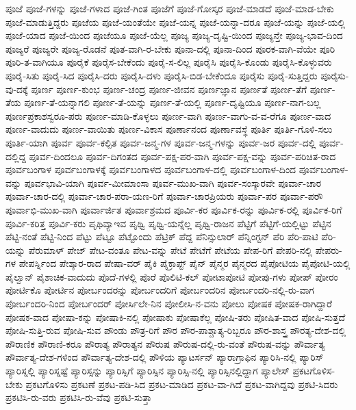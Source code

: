 {ಪೂಜೆ
ಪೂಜೆ-ಗಳನ್ನು
ಪೂಜೆ-ಗಳಾದ
ಪೂಜೆ-ಗಿಂತ
ಪೂಜೆಗೆ
ಪೂಜೆ-ಗೋಸ್ಕರ
ಪೂಜೆ-ಮಾಡದೆ
ಪೂಜೆ-ಮಾಡ-ಬೇಕು
ಪೂಜೆ-ಮಾಡುತ್ತಿದ್ದರು
ಪೂಜೆಯ
ಪೂಜೆ-ಯಂತೆಯೇ
ಪೂಜೆ-ಯನ್ನ
ಪೂಜೆ-ಯನ್ನಾ-ದರೂ
ಪೂಜೆ-ಯನ್ನು
ಪೂಜೆ-ಯಲ್ಲಿ
ಪೂಜೆ-ಯಾದ
ಪೂಜೆ-ಯಿಂದ
ಪೂಜೆಯೂ
ಪೂಜೆ-ಯೆಲ್ಲ
ಪೂಜ್ಯ
ಪೂಜ್ಯ-ದೃಷ್ಟಿ-ಯಿಂದ
ಪೂಜ್ಯನ್ತೇ
ಪೂಜ್ಯ-ಭಾವ-ದಿಂದ
ಪೂಜ್ಯರೆ
ಪೂಜ್ಯರೇ
ಪೂಜ್ಯ-ರೊಡನೆ
ಪೂತ-ವಾಗಿ-ರ-ಬೇಕು
ಪೂನಾ-ದಲ್ಲಿ
ಪೂನಾ-ದಿಂದ
ಪೂರಕ-ವಾಗಿ-ವೆಯೇ
ಪೂರಿ
ಪೂರಿ-ತ-ವಾಗಿಯೂ
ಪೂರೈಕೆ
ಪೂರೈಸ-ಬೇಕೆಂದು
ಪೂರೈ-ಸ-ಲಿಲ್ಲ
ಪೂರೈಸಿ
ಪೂರೈಸಿ-ಕೊಂಡು
ಪೂರೈಸಿ-ಕೊಳ್ಳುವರು
ಪೂರೈ-ಸಿತು
ಪೂರೈ-ಸಿದ
ಪೂರೈಸಿ-ದರು
ಪೂರೈಸಿ-ದಳು
ಪೂರೈಸಿ-ಬಿಡ-ಬೇಕೆಂದೂ
ಪೂರೈಸು
ಪೂರೈ-ಸುತ್ತಿದ್ದರು
ಪೂರೈಸು-ವು-ದಕ್ಕೆ
ಪೂರ್ಣ
ಪೂರ್ಣ-ಕುಂಭ
ಪೂರ್ಣ-ಚಂದ್ರ
ಪೂರ್ಣ-ಜೀವನ
ಪೂರ್ಣಜ್ಞಾನ
ಪೂರ್ಣತೆ
ಪೂರ್ಣ-ತೆಗೆ
ಪೂರ್ಣ-ತೆಯ
ಪೂರ್ಣ-ತೆ-ಯನ್ನಾಗಲಿ
ಪೂರ್ಣ-ತೆ-ಯನ್ನು
ಪೂರ್ಣ-ತೆ-ಯಲ್ಲಿ
ಪೂರ್ಣ-ದೃಷ್ಟಿಯೂ
ಪೂರ್ಣ-ನಾಗ-ಬಲ್ಲ
ಪೂರ್ಣಪ್ರಕಾಶಸ್ವರೂ-ಪರು
ಪೂರ್ಣ-ಮಾಡಿ-ಕೊಳ್ಳಲು
ಪೂರ್ಣ-ವಾಗಿ
ಪೂರ್ಣ-ವಾಗು-ವ-ವ-ರೆಗೂ
ಪೂರ್ಣ-ವಾದ
ಪೂರ್ಣ-ವಾದುದು
ಪೂರ್ಣ-ವಾಯಿತು
ಪೂರ್ಣ-ವಿಕಾಸ
ಪೂರ್ಣಾನಂದ
ಪೂರ್ಣಾವಸ್ಥೆ
ಪೂರ್ತಿ
ಪೂರ್ತಿ-ಗೊಳಿ-ಸಲು
ಪೂರ್ತಿ-ಯಾಗಿ
ಪೂರ್ವ
ಪೂರ್ವ-ಕಲ್ಪಿತ
ಪೂರ್ವ-ಜನ್ಮ-ಗಳ
ಪೂರ್ವ-ಜನ್ಮ-ಗಳನ್ನು
ಪೂರ್ವ-ಜರ
ಪೂರ್ವ-ದಲ್ಲಿ
ಪೂರ್ವ-ದಲ್ಲಿದ್ದ
ಪೂರ್ವ-ದಿಂದಲೂ
ಪೂರ್ವ-ದಿಗಂತದ
ಪೂರ್ವ-ಪಕ್ಷ-ಪರ-ವಾಗಿ
ಪೂರ್ವ-ಪಕ್ಷ-ವನ್ನು
ಪೂರ್ವ-ಪರಿಚಿತ-ರಾದ
ಪೂರ್ವಬಂಗಾಳ
ಪೂರ್ವಬಂಗಾಳಕ್ಕೆ
ಪೂರ್ವಬಂಗಾಳದ
ಪೂರ್ವಬಂಗಾಳ-ದಲ್ಲಿ
ಪೂರ್ವಬಂಗಾಳ-ದಿಂದ
ಪೂರ್ವಬಂಗಾಳ-ವನ್ನು
ಪೂರ್ವಭಾವಿ-ಯಾಗಿ
ಪೂರ್ವ-ಮೀಮಾಂಸಾ
ಪೂರ್ವ-ಮುಖ-ವಾಗಿ
ಪೂರ್ವ-ಸಂಸ್ಕಾರವೇ
ಪೂರ್ವಾ-ಚಾರ
ಪೂರ್ವಾ-ಚಾರ-ದಲ್ಲಿ
ಪೂರ್ವಾ-ಚಾರ-ಪರಾ-ಯಣ-ರಿಗೆ
ಪೂರ್ವಾ-ಚಾರಪ್ರಿಯರು
ಪೂರ್ವಾ-ಪರ
ಪೂರ್ವಾ-ಪರೌ
ಪೂರ್ವಾಭಿ-ಮುಖ-ವಾಗಿ
ಪೂರ್ವಾರ್ಜಿತ
ಪೂರ್ವಾಶ್ರಮದ
ಪೂರ್ವಿ-ಕರ
ಪೂರ್ವಿಕ-ರನ್ನು
ಪೂರ್ವಿಕ-ರಲ್ಲಿ
ಪೂರ್ವಿಕ-ರಿಗೆ
ಪೂರ್ವಿ-ಕರಿತ್ತ
ಪೂರ್ವಿ-ಕರು
ಪೃಥಿವ್ಯಾಇವ
ಪೃಥ್ವಿ
ಪೃಥ್ವಿ-ಯನ್ನೆಲ್ಲ
ಪೃಥ್ವಿ-ರಾಜನ
ಪೆಟ್ಟಿಗೆ
ಪೆಟ್ಟಿಗೆ-ಯಲ್ಲಿಟ್ಟು
ಪೆಟ್ಟಿನ
ಪೆಟ್ಟಿ-ನಂತೆ
ಪೆಟ್ಟಿ-ನಿಂದ
ಪೆಟ್ಟು
ಪೆಟ್ಟೂ
ಪೆಟ್ಟೊಂದು
ಪೆಟ್ರಿಕ್
ಪೆದ್ದ
ಪೆನಿನ್ಸುಲಾರ್
ಪೆನ್ನಿಂಗ್ಟನ್
ಪೆರಿ
ಪೆರಿ-ಪಾಟಿ
ಪೆರಿ-ಯನ್ನು
ಪೆರುಮಾಳ್
ಪೇಜ್
ಪೇಟ-ವಂತೂ
ಪೇಟ-ವನ್ನು
ಪೇಟೆ
ಪೇಟೆಗೆ
ಪೇಟೆಯ
ಪೇಪ-ರಿಗೆ
ಪೇಪರಿ-ನಲ್ಲಿ
ಪೇಪರು-ಗಳ
ಪೇಪರ್ಸ್ನಿಂದ
ಪೇಶ್ಕಾರ-ರಾದ
ಪೇಷಾ-ವರ್
ಪೈಕಿ
ಪೈಕ್ರಾಪ್ಟ್
ಪೈನ್
ಪೈನ್ಮರ
ಪೈನ್ಮರದ
ಪೈಪೋಟಿಯ
ಪೈಪೋಟಿ-ಯಲ್ಲಿ
ಪೈಲ್ವಾನ್
ಪೈಶಾಚಿಕ-ವಾದುದು
ಪೊದೆ-ಗಳಲ್ಲಿ
ಪೊರೆ
ಪೊಲಿಟಿ-ಕಲ್
ಪೋಟಾಪೋಟಿ
ಪೋಪು-ಗಳು
ಪೋಪ್
ಪೋರಂ
ಪೋರ್ಟಿಕೊ
ಪೋರ್ಟಿನ
ಪೋರ್ಬಂದರನ್ನು
ಪೋರ್ಬಂದರಿಗೆ
ಪೋರ್ಬಂದರಿನ
ಪೋರ್ಬಂದರಿ-ನಲ್ಲಿ-ರು-ವಾಗ
ಪೋರ್ಬಂದರಿ-ನಿಂದ
ಪೋರ್ಬಂದರ್
ಪೋರ್ಸಿಲೇ-ನಿನ
ಪೋಲೀಸಿ-ನ-ವನು
ಪೋಲು
ಪೋಷಕ
ಪೋಷಕ-ರಾಗಿದ್ದಾರೆ
ಪೋಷಕ-ವಾದ
ಪೋಷಾ-ಕನ್ನು
ಪೋಷಾಕಿ-ನಲ್ಲಿ
ಪೋಷಾಕು
ಪೋಷಾಕೆಲ್ಲ
ಪೋಷಿ-ತರು
ಪೋಷಿತ-ವಾದ
ಪೋಷಿ-ಸುತ್ತದೆ
ಪೋಷಿ-ಸುತ್ತಿ-ರುವ
ಪೋಷಿ-ಸುವ
ಪೌಂಡು
ಪೌತ್ರ-ರಿಗೆ
ಪೌರ
ಪೌರ-ಪಾಶ್ಚಾತ್ಯ-ರಿಬ್ಬರೂ
ಪೌರ-ಶಾಸ್ತ್ರ
ಪೌರತ್ಯ-ದೇಶ-ದಲ್ಲಿ
ಪೌರಾಣಿಕ
ಪೌರಾಣಿ-ಕರೂ
ಪೌರಾತ್ಯ
ಪೌರಾತ್ಯನ
ಪೌರುಷ
ಪೌರುಷ-ದಲ್ಲಿ-ರು-ವಂತೆ
ಪೌರುಷ-ವನ್ನು
ಪೌರ್ವಾತ್ಯ
ಪೌರ್ವಾತ್ಯ-ದೇಶ-ಗಳಿಂದ
ಪೌರ್ವಾತ್ಯ-ದೇಶ-ದಲ್ಲಿ
ಪೌಳಿಯ
ಪ್ಯಾಟರ್ಸನ್
ಪ್ಯಾರಾಗ್ರಾಫಿನ
ಪ್ಯಾರಿಸಿ-ನಲ್ಲಿ
ಪ್ಯಾರಿಸ್
ಪ್ಯಾರಿಸ್ನಲ್ಲಿ
ಪ್ಯಾರಿಸ್ನಷ್ಟೆ
ಪ್ಯಾರಿಸ್ಸನ್ನು
ಪ್ಯಾರಿಸ್ಸಿಗೆ
ಪ್ಯಾರಿಸ್ಸಿನ
ಪ್ಯಾರಿಸ್ಸಿ-ನಲ್ಲಿ
ಪ್ಯಾರಿಸ್ಸಿನಲ್ಲಿದ್ದಾಗ
ಪ್ಯಾಲೇಸ್
ಪ್ರಕಟಗೊಳಿಸ-ಬೇಕು
ಪ್ರಕಟಗೊಳಿಸು
ಪ್ರಕಟಣೆ
ಪ್ರಕಟ-ಪಡಿ-ಸಿದ
ಪ್ರಕಟ-ಮಾಡಿದ
ಪ್ರಕಟ-ವಾ-ಗಿದೆ
ಪ್ರಕಟ-ವಾಗಿದ್ದವು
ಪ್ರಕಟಿ-ಸಿದರು
ಪ್ರಕಟಿಸಿ-ರು-ವರು
ಪ್ರಕಟಿಸಿ-ರು-ವೆವು
ಪ್ರಕಟಿ-ಸುತ್ತಾ
}
